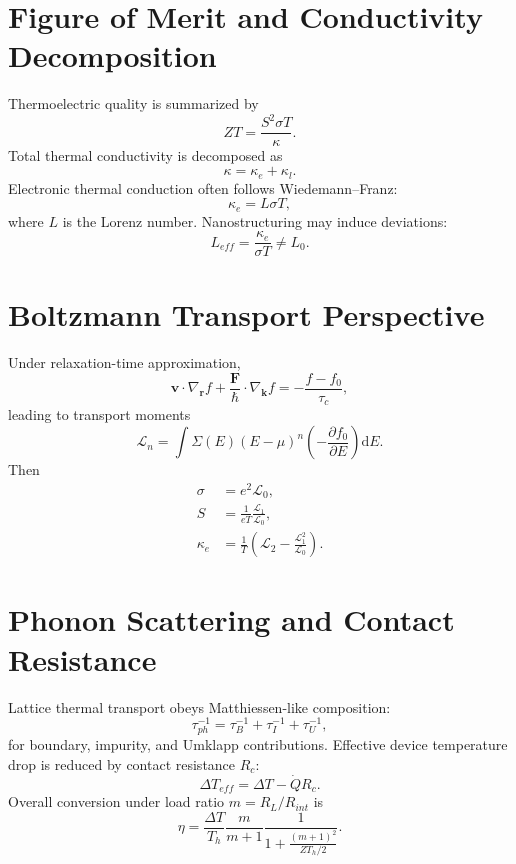 \section{Figure of Merit and Conductivity Decomposition}
Thermoelectric quality is summarized by
\begin{equation}\label{eq:zt}
ZT=\frac{S^2\sigma T}{\kappa}.
\end{equation}
Total thermal conductivity is decomposed as
\begin{equation}\label{eq:kappa_decomp}
\kappa=\kappa_e+\kappa_l.
\end{equation}
Electronic thermal conduction often follows Wiedemann--Franz:
\begin{equation}\label{eq:wf}
\kappa_e=L\sigma T,
\end{equation}
where $L$ is the Lorenz number. Nanostructuring may induce deviations:
\begin{equation}\label{eq:lorenz_dev}
L_{eff}=\frac{\kappa_e}{\sigma T}\neq L_0.
\end{equation}

\section{Boltzmann Transport Perspective}
Under relaxation-time approximation,
\begin{equation}\label{eq:bte}
\mathbf{v}\cdot\nabla_{\mathbf{r}}f+\frac{\mathbf{F}}{\hbar}\cdot\nabla_{\mathbf{k}}f=-\frac{f-f_0}{\tau_c},
\end{equation}
leading to transport moments
\begin{equation}\label{eq:Lmoments}
\mathcal{L}_n=\int \Sigma(E)(E-\mu)^n\left(-\frac{\partial f_0}{\partial E}\right)\mathrm{d}E.
\end{equation}
Then
\begin{align}
\sigma &= e^2\mathcal{L}_0, \label{eq:sigmaL}\\
S &= \frac{1}{eT}\frac{\mathcal{L}_1}{\mathcal{L}_0}, \label{eq:SL}\\
\kappa_e &= \frac{1}{T}\left(\mathcal{L}_2-\frac{\mathcal{L}_1^2}{\mathcal{L}_0}\right). \label{eq:kL}
\end{align}

\section{Phonon Scattering and Contact Resistance}
Lattice thermal transport obeys Matthiessen-like composition:
\begin{equation}\label{eq:matthiessen}
\tau_{ph}^{-1}=\tau_B^{-1}+\tau_I^{-1}+\tau_U^{-1},
\end{equation}
for boundary, impurity, and Umklapp contributions. Effective device temperature drop is reduced by contact resistance $R_c$:
\begin{equation}\label{eq:contact_drop}
\Delta T_{eff}=\Delta T-\dot{Q}R_c.
\end{equation}
Overall conversion under load ratio $m=R_L/R_{int}$ is
\begin{equation}\label{eq:eta_m}
\eta=\frac{\Delta T}{T_h}\frac{m}{m+1}\frac{1}{1+\frac{(m+1)^2}{ZT_h/2}}.
\end{equation}


